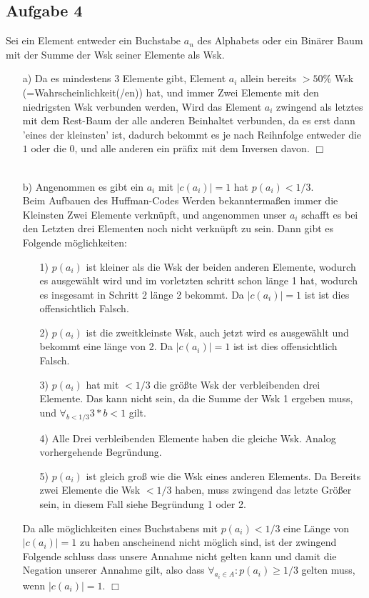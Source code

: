 \documentclass{scrartcl}
\begin{document}
	\subsection*{Aufgabe 4}
      Sei ein Element entweder ein Buchstabe $a_n$ des Alphabets oder ein Binärer Baum mit
      der Summe der Wsk seiner Elemente als Wsk. \\
  \begin{itemize}
    \item[a)] Da es mindestens 3 Elemente gibt, Element $a_i$ allein bereits $> 50\%$ Wsk
      (=Wahrscheinlichkeit(/en)) hat, und immer Zwei Elemente mit den niedrigsten Wsk verbunden werden,
      Wird das Element $a_i$ zwingend als letztes mit dem Rest-Baum der alle anderen Beinhaltet verbunden,
      da es erst dann 'eines der kleinsten' ist, dadurch bekommt es je nach Reihnfolge entweder die
      $1$ oder die $0$, und alle anderen ein präfix mit dem Inversen davon.
      \hfill $\Box$ \\ \\


    \item[b)]
      Angenommen es gibt ein $a_i$ mit $|c(a_i)| = 1$ hat $p(a_i) < 1/3$. \\
      Beim Aufbauen des Huffman-Codes Werden bekanntermaßen immer die Kleinsten Zwei Elemente
      verknüpft, und angenommen unser $a_i$ schafft es bei den Letzten drei Elementen noch nicht
      verknüpft zu sein. Dann gibt es Folgende möglichkeiten:
      \begin{itemize}
        \item[1)] $p(a_i)$ ist kleiner als die Wsk der beiden anderen Elemente,
          wodurch es ausgewählt wird und im vorletzten schritt schon länge 1 hat, wodurch
          es insgesamt in Schritt 2 länge 2 bekommt. Da $|c(a_i)| = 1$ ist ist dies offensichtlich Falsch.
        \item[2)] $p(a_i)$ ist die zweitkleinste Wsk, auch jetzt wird es ausgewählt und bekommt
          eine länge von 2. Da $|c(a_i)| = 1$ ist ist dies offensichtlich Falsch.
        \item[3)] $p(a_i)$ hat mit $< 1/3$ die größte Wsk der verbleibenden drei Elemente. Das kann nicht sein,
          da die Summe der Wsk 1 ergeben muss, und \(\forall_{b < 1/3} 3 * b < 1\) gilt.
        \item[4)] Alle Drei verbleibenden Elemente haben die gleiche Wsk. Analog vorhergehende Begründung.

        \item[5)] $p(a_i)$ ist gleich groß wie die Wsk eines anderen Elements. Da Bereits zwei Elemente
          die Wsk $< 1/3$ haben, muss zwingend das letzte Größer sein, in diesem Fall siehe
          Begründung 1 oder 2.
      \end{itemize}
      Da alle möglichkeiten eines Buchstabens mit $p(a_i) < 1/3$ eine Länge von $|c(a_i)| = 1$ zu haben
      anscheinend nicht möglich sind, ist der zwingend Folgende schluss dass unsere Annahme nicht gelten kann
      und damit die Negation unserer Annahme gilt,
      also dass \(\forall_{a_i \in A}: p(a_i) \geq 1/3\) gelten muss, wenn $|c(a_i)| = 1$. \hfill $\Box$


  \end{itemize}
\end{document}
